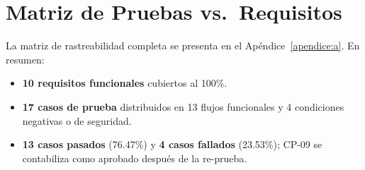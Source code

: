 \section{Matriz de Pruebas vs.\ Requisitos}
\label{sec:matriz-pruebas}

La matriz de rastreabilidad completa se presenta en el Apéndice~\ref{apendice:a}. En resumen:

\begin{itemize}
    \item \textbf{10 requisitos funcionales} cubiertos al 100\%.
    \item \textbf{17 casos de prueba} distribuidos en 13 flujos funcionales y 4 condiciones negativas o de seguridad.
    \item \textbf{13 casos pasados} (76.47\%) y \textbf{4 casos fallados} (23.53\%); CP-09 se contabiliza como aprobado después de la re-prueba.
\end{itemize}
